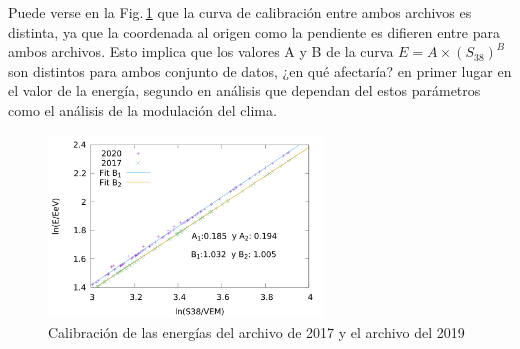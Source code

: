       Puede verse en la Fig.\,\ref{fig:calibracionE} que la curva de calibración entre ambos archivos es distinta, ya que la coordenada al origen como la pendiente es difieren entre para ambos archivos. Esto implica que los valores A y B de la curva $E=A\times (S_{38})^B$ son distintos para ambos conjunto de datos, ¿en qué afectaría? en primer lugar en el valor de la energía, segundo en análisis que dependan del estos parámetros como el análisis de la modulación del clima.

        \begin{figure}[H]
          \centering
          \includegraphics[width=0.65\textwidth]{../0_Introduccion/comparacion_reconstruccion.png}
          \caption{Calibración de las energías del archivo de 2017 y el archivo del 2019}
          \label{fig:calibracionE}
        \end{figure}
